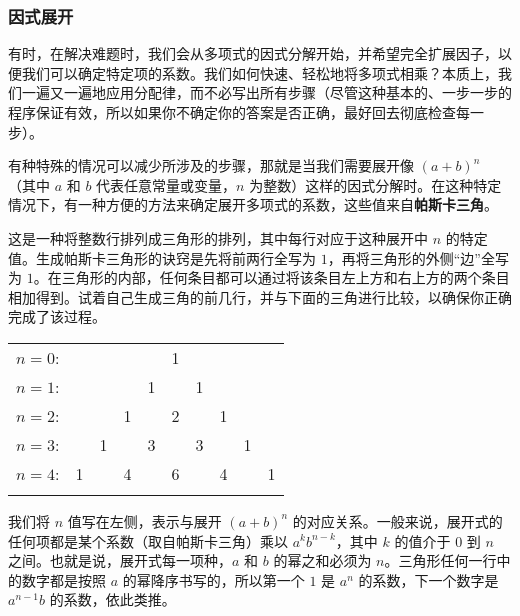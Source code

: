 \subsubsection*{因式展开}

有时，在解决难题时，我们会从多项式的因式分解开始，并希望完全扩展因子，以便我们可以确定特定项的系数。我们如何快速、轻松地将多项式相乘？本质上，我们一遍又一遍地应用分配律，而不必写出所有步骤（尽管这种基本的、一步一步的程序保证有效，所以如果你不确定你的答案是否正确，最好回去彻底检查每一步）。

有种特殊的情况可以减少所涉及的步骤，那就是当我们需要展开像 $(a+b)^n$ （其中 $a$ 和 $b$ 代表任意常量或变量，$n$ 为整数）这样的因式分解时。在这种特定情况下，有一种方便的方法来确定展开多项式的系数，这些值来自\textbf{帕斯卡三角}。

这是一种将整数行排列成三角形的排列，其中每行对应于这种展开中 $n$ 的特定值。生成帕斯卡三角形的诀窍是先将前两行全写为 $1$，再将三角形的外侧``边''全写为 $1$。在三角形的内部，任何条目都可以通过将该条目左上方和右上方的两个条目相加得到。试着自己生成三角的前几行，并与下面的三角进行比较，以确保你正确完成了该过程。

\begin{center}
    \begin{tabular}{rccccccccc}
        $n=0$: &    &    &    &    &  1\\\noalign{\smallskip\smallskip}
        $n=1$: &    &    &    &  1 &    &  1\\\noalign{\smallskip\smallskip}
        $n=2$: &    &    &  1 &    &  2 &    &  1\\\noalign{\smallskip\smallskip}
        $n=3$: &    &  1 &    &  3 &    &  3 &    &  1\\\noalign{\smallskip\smallskip}
        $n=4$: &  1 &    &  4 &    &  6 &    &  4 &    &  1\\\noalign{\smallskip\smallskip}
    \end{tabular}
\end{center}

我们将 $n$ 值写在左侧，表示与展开 $(a+b)^n$ 的对应关系。一般来说，展开式的任何项都是某个系数（取自帕斯卡三角）乘以 $a^kb^{n-k}$，其中 $k$ 的值介于 $0$ 到 $n$ 之间。也就是说，展开式每一项种，$a$ 和 $b$ 的幂之和必须为 $n$。三角形任何一行中的数字都是按照 $a$ 的幂降序书写的，所以第一个 $1$ 是 $a^n$ 的系数，下一个数字是 $a^{n-1}b$ 的系数，依此类推。

